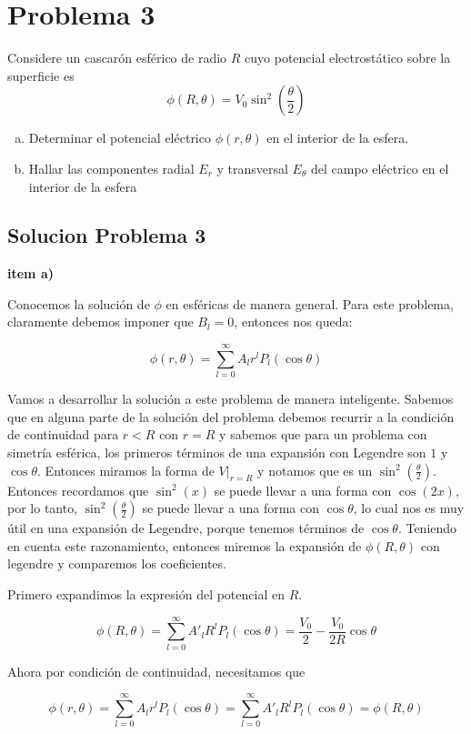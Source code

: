 \documentclass[a4paper]{article}
\begin{document}
\section{Problema 3}
Considere un cascarón esférico de radio $R$ cuyo potencial electrostático sobre la superficie es 
$$\phi(R,\theta) = V_0 \sin^2\left(\frac{\theta}{2}\right)$$
\begin{enumerate}[a)]
\item Determinar el potencial eléctrico $\phi(r,\theta)$ en el interior de la esfera.
\item Hallar las componentes radial $E_r$ y transversal $E_\theta$ del campo eléctrico en el interior de la esfera
\end{enumerate}

\subsection{Solucion Problema 3}
\textbf{item a)}

Conocemos la solución de $\phi$ en esféricas de manera general. Para este problema, claramente debemos imponer que $B_l = 0$, entonces nos queda:

$$
\phi(r,\theta) = \sum_{l=0}^{\infty} A_l r^l P_l(\cos\theta)
$$

Vamos a desarrollar la solución a este problema de manera inteligente. Sabemos que en alguna parte de la solución del problema debemos recurrir a la condición de continuidad para $r<R$ con $r=R$ y sabemos que para un problema con simetría esférica, los primeros términos de una expansión con Legendre son $1$ y $\cos\theta$. Entonces miramos la forma de $V\Bigg|_{r=R}$ y notamos que es un $\sin^2\left(\frac{\theta}{2}\right)$. Entonces recordamos que $\sin^2(x)$ se puede llevar a una forma con $\cos(2x)$, por lo tanto, $\sin^2\left(\frac{\theta}{2}\right)$ se puede llevar a una forma con $\cos\theta$, lo cual nos es muy útil en una expansión de Legendre, porque tenemos términos de $\cos\theta$. Teniendo en cuenta este razonamiento, entonces miremos la expansión de $\phi(R,\theta)$ con legendre y comparemos los coeficientes.

Primero expandimos la expresión del potencial en $R$.

$$\phi(R,\theta) = \sum_{l=0}^{\infty} A'_l R^l P_l(\cos\theta) = \frac{V_0}{2} - \frac{V_0}{2R}\cos\theta$$

Ahora por condición de continuidad, necesitamos que 

$$\phi(r,\theta) = \sum_{l=0}^{\infty} A_l r^l P_l(\cos\theta) = \sum_{l=0}^{\infty} A'_l R^l P_l(\cos\theta) = \phi(R,\theta)$$
\end{document}
